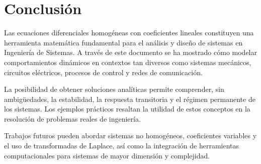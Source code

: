 \section{Conclusión}

Las ecuaciones diferenciales homogéneas con coeficientes lineales constituyen una herramienta matemática fundamental para el análisis y diseño de sistemas en Ingeniería de Sistemas. A través de este documento se ha mostrado cómo modelar comportamientos dinámicos en contextos tan diversos como sistemas mecánicos, circuitos eléctricos, procesos de control y redes de comunicación.

La posibilidad de obtener soluciones analíticas permite comprender, sin ambigüedades, la estabilidad, la respuesta transitoria y el régimen permanente de los sistemas. Los ejemplos prácticos resaltan la utilidad de estos conceptos en la resolución de problemas reales de ingeniería.

Trabajos futuros pueden abordar sistemas no homogéneos, coeficientes variables y el uso de transformadas de Laplace, así como la integración de herramientas computacionales para sistemas de mayor dimensión y complejidad.